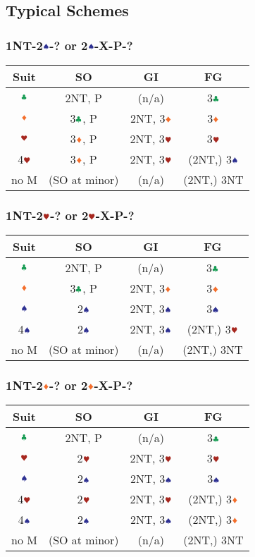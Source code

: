 \documentclass{article}
\newcommand*{\ccc}{\textcolor{ForestGreen}{\clubsuit}}
\newcommand*{\ddd}{\textcolor{Orange}{\vardiamondsuit}}
\newcommand*{\hhh}{\textcolor{Mahogany}{\varheartsuit}}
\newcommand*{\sss}{\textcolor{Blue}{\spadesuit}}
\begin{document}
\begin{multicols}{2}
\subsection{Typical Schemes}
\subsubsection{1NT-2$\sss$-? or 2$\sss$-X-P-?}
\begin{tabular}{|c|c|c|c|}
    \hline
    Suit & SO & GI & FG \\ \hline
    $\ccc$ & 2NT, P & (n/a) & 3$\ccc$ \\ \hline
    $\ddd$ & 3$\ccc$, P & 2NT, 3$\ddd$ & 3$\ddd$ \\ \hline
    $\hhh$ & 3$\ddd$, P & 2NT, 3$\hhh$ & 3$\hhh$ \\ \hline
    4$\hhh$ & 3$\ddd$, P & 2NT, 3$\hhh$ & (2NT,) 3$\sss$ \\ \hline
    no M & (SO at minor) & (n/a) & (2NT,) 3NT \\ \hline
\end{tabular}

\subsubsection{1NT-2$\hhh$-? or 2$\hhh$-X-P-?}
\begin{tabular}{|c|c|c|c|}
    \hline
    Suit & SO & GI & FG \\ \hline
    $\ccc$ & 2NT, P & (n/a) & 3$\ccc$ \\ \hline
    $\ddd$ & 3$\ccc$, P & 2NT, 3$\ddd$ & 3$\ddd$ \\ \hline
    $\sss$ & 2$\sss$ & 2NT, 3$\sss$ & 3$\sss$ \\ \hline
    4$\sss$ & 2$\sss$ & 2NT, 3$\sss$ & (2NT,) 3$\hhh$ \\ \hline
    no M & (SO at minor) & (n/a) & (2NT,) 3NT \\ \hline
\end{tabular}

\subsubsection{1NT-2$\ddd$-? or 2$\ddd$-X-P-?}
\begin{tabular}{|c|c|c|c|}
    \hline
    Suit & SO & GI & FG \\ \hline
    $\ccc$ & 2NT, P & (n/a) & 3$\ccc$ \\ \hline
    $\hhh$ & 2$\hhh$ & 2NT, 3$\hhh$ & 3$\hhh$ \\ \hline
    $\sss$ & 2$\sss$ & 2NT, 3$\sss$ & 3$\sss$ \\ \hline
    4$\hhh$ & 2$\hhh$ & 2NT, 3$\hhh$ & (2NT,) 3$\ddd$ \\ \hline
    4$\sss$ & 2$\sss$ & 2NT, 3$\sss$ & (2NT,) 3$\ddd$ \\ \hline
    no M & (SO at minor) & (n/a) & (2NT,) 3NT \\ \hline
\end{tabular}


\end{multicols}
\end{document}
